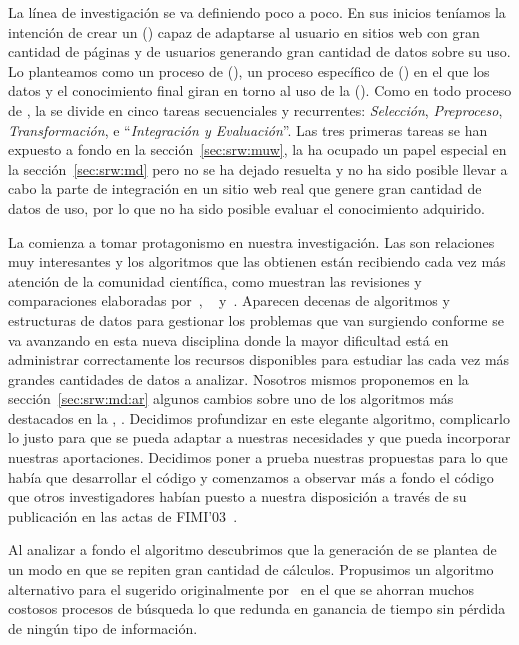 La línea de investigación se va definiendo poco a poco. En sus inicios teníamos la intención de crear un \srw (\SRW) capaz de adaptarse al usuario en sitios web con gran cantidad de páginas y de usuarios generando gran cantidad de datos sobre su uso. Lo planteamos como un proceso de \wum (\WUM), un proceso específico de \kdd (\KDD) en el que los datos y el conocimiento final giran en torno al uso de la \www (\WWW). Como en todo proceso de \KDD, la \WUM se divide en cinco tareas secuenciales y recurrentes: \emph{Selección}, \emph{Preproceso}, \emph{Transformación}, \dm e "`\emph{Integración y Evaluación}"'. Las tres primeras tareas se han expuesto a fondo en la sección~\ref{sec:srw:muw}, la \dm ha ocupado un papel especial en la sección~\ref{sec:srw:md} pero no se ha dejado resuelta y no ha sido posible llevar a cabo la parte de integración en un sitio web real que genere gran cantidad de datos de uso, por lo que no ha sido posible evaluar el conocimiento adquirido.

La \dm comienza a tomar protagonismo en nuestra investigación. Las \ARs son relaciones muy interesantes y los algoritmos que las obtienen están recibiendo cada vez más atención de la comunidad científica, como muestran las revisiones y comparaciones elaboradas por~\citet{HippGuntzerNakhaeizadeh-AlgorithmsForAssociationRuleMining-2000}, ~\citet{ZhaoBhowmick-ARMSurvey-2003} y~\citet{Goethals-SurveyOnFPM-2003}. Aparecen decenas de algoritmos y estructuras de datos para gestionar los problemas que van surgiendo conforme se va avanzando en esta nueva disciplina donde la mayor dificultad está en administrar correctamente los recursos disponibles para estudiar las cada vez más grandes cantidades de datos a analizar. Nosotros mismos proponemos en la sección~\ref{sec:srw:md:ar} algunos cambios sobre uno de los algoritmos más destacados en la \arm, \apriori. Decidimos profundizar en este elegante algoritmo, complicarlo lo justo para que se pueda adaptar a nuestras necesidades y que pueda incorporar nuestras aportaciones. Decidimos poner a prueba nuestras propuestas para lo que había que desarrollar el código y comenzamos a observar más a fondo el código que otros investigadores habían puesto a nuestra disposición a través de su publicación en las actas de FIMI'03~\citep{ZakiGoethals-ProceedingsFIMI-2003}.

Al analizar a fondo el algoritmo \apriori descubrimos que la generación de \ars se plantea de un modo en que se repiten gran cantidad de cálculos. Propusimos un algoritmo alternativo para el sugerido originalmente por~\citet{AgrawalSrikant-FastAlgorithmsForMiningAssociationRules-LARGO-1994} en el que se ahorran muchos costosos procesos de búsqueda lo que redunda en ganancia de tiempo sin pérdida de ningún tipo de información.

